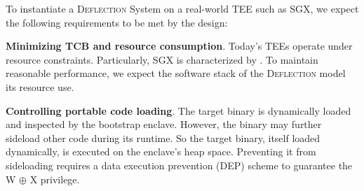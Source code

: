 To instantiate a \textsc{Deflection} System on a real-world TEE such as SGX, we expect the following requirements to be met by the design: 


\vspace{3pt}\noindent\textbf{Minimizing TCB and resource consumption}.\label{challenge-tcb}\label{challenge-size} 
Today's TEEs operate under resource constraints.  Particularly, SGX is characterized by \DIFdelbegin {}\DIFdelend \DIFaddbegin {}\DIFaddend . To maintain reasonable performance, we expect the software stack of the \textsc{Deflection} model \DIFdelbegin {}\DIFdelend \DIFaddbegin {}\DIFaddend its resource use. 
\DIFdelbegin {}\DIFdelend %

\vspace{3pt}\noindent\textbf{Controlling portable code loading}.\label{challenge-dep} The target binary is dynamically loaded and inspected by the bootstrap enclave. However, the binary may further sideload other code during its runtime. 
So the target binary, itself loaded dynamically, is executed on the enclave's heap space. Preventing it from sideloading requires a data execution prevention (DEP) scheme to guarantee the W $\oplus$ X privilege.


